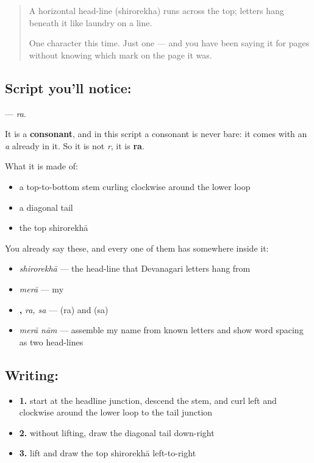 \label{lesson:HI-S110-letter-ra}



\begin{quote}
A horizontal head-line (shirorekha) runs across the top; letters hang beneath it like laundry on a line.

One character this time. Just one — and you have been saying it for pages without knowing which mark on the page it was.
\end{quote}

\subsection*{Script you'll notice: }
\textbf{} — \emph{ra}.

It is a \textbf{consonant}, and in this script a consonant is never bare: it comes with an \emph{a} already in it. So it is not \emph{r}, it is \textbf{ra}.

What it is made of:

\begin{itemize}
\raggedright
  \item a top-to-bottom stem curling clockwise around the lower loop
  \item a diagonal tail
  \item the top shirorekhā
\end{itemize}

You already say these, and every one of them has  somewhere inside it:

\begin{itemize}
\raggedright
  \item \textbf{} \emph{shirorekhā} — the head-line that Devanagari letters hang from
  \item \textbf{} \emph{merā} — my
  \item \textbf{, } \emph{ra, sa} —  (ra) and  (sa)
  \item \textbf{ } \emph{merā nām} — assemble my name from known letters and show word spacing as two head-lines
\end{itemize}

\subsection*{Writing: }

\begin{itemize}
\raggedright
  \item \textbf{1.} start at the headline junction, descend the stem, and curl left and clockwise around the lower loop to the tail junction
  \item \textbf{2.} without lifting, draw the diagonal tail down-right
  \item \textbf{3.} lift and draw the top shirorekhā left-to-right
\end{itemize}


